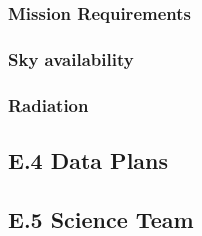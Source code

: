\documentclass[12pt,journal]{IEEEtran}
\begin{document}
\subsubsection{Mission Requirements}\label{sec:sci_mission_req}

\subsubsection{Sky availability}

\subsubsection{Radiation}\label{sec:radiation_flux_rates}

\subsection{E.4	Data Plans}

\subsection{E.5	Science Team}
\end{document}
